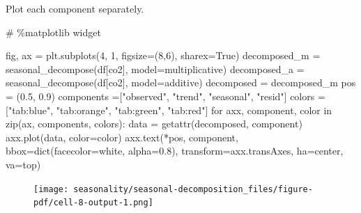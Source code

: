 \documentclass[
  letterpaper,
  DIV=11,
  numbers=noendperiod,
  oneside]{scrreprt}
\newenvironment{Shaded}{\begin{snugshade}}{\end{snugshade}}
\newcommand{\BuiltInTok}[1]{\textcolor[rgb]{0.00,0.23,0.31}{#1}}
\newcommand{\CommentTok}[1]{\textcolor[rgb]{0.37,0.37,0.37}{#1}}
\newcommand{\ControlFlowTok}[1]{\textcolor[rgb]{0.00,0.23,0.31}{#1}}
\newcommand{\DecValTok}[1]{\textcolor[rgb]{0.68,0.00,0.00}{#1}}
\newcommand{\FloatTok}[1]{\textcolor[rgb]{0.68,0.00,0.00}{#1}}
\newcommand{\KeywordTok}[1]{\textcolor[rgb]{0.00,0.23,0.31}{#1}}
\newcommand{\NormalTok}[1]{\textcolor[rgb]{0.00,0.23,0.31}{#1}}
\newcommand{\OperatorTok}[1]{\textcolor[rgb]{0.37,0.37,0.37}{#1}}
\newcommand{\StringTok}[1]{\textcolor[rgb]{0.13,0.47,0.30}{#1}}
\newcommand{\VariableTok}[1]{\textcolor[rgb]{0.07,0.07,0.07}{#1}}
\begin{document}
Plot each component separately.

\begin{Shaded}
\begin{Highlighting}[]
\CommentTok{\# \%matplotlib widget}

\NormalTok{fig, ax }\OperatorTok{=}\NormalTok{ plt.subplots(}\DecValTok{4}\NormalTok{, }\DecValTok{1}\NormalTok{, figsize}\OperatorTok{=}\NormalTok{(}\DecValTok{8}\NormalTok{,}\DecValTok{6}\NormalTok{), sharex}\OperatorTok{=}\VariableTok{True}\NormalTok{)}
\NormalTok{decomposed\_m }\OperatorTok{=}\NormalTok{ seasonal\_decompose(df[}\StringTok{\textquotesingle{}co2\textquotesingle{}}\NormalTok{], model}\OperatorTok{=}\StringTok{\textquotesingle{}multiplicative\textquotesingle{}}\NormalTok{)}
\NormalTok{decomposed\_a }\OperatorTok{=}\NormalTok{ seasonal\_decompose(df[}\StringTok{\textquotesingle{}co2\textquotesingle{}}\NormalTok{], model}\OperatorTok{=}\StringTok{\textquotesingle{}additive\textquotesingle{}}\NormalTok{)}
\NormalTok{decomposed }\OperatorTok{=}\NormalTok{ decomposed\_m}
\NormalTok{pos }\OperatorTok{=}\NormalTok{ (}\FloatTok{0.5}\NormalTok{, }\FloatTok{0.9}\NormalTok{)}
\NormalTok{components }\OperatorTok{=}\NormalTok{[}\StringTok{"observed"}\NormalTok{, }\StringTok{"trend"}\NormalTok{, }\StringTok{"seasonal"}\NormalTok{, }\StringTok{"resid"}\NormalTok{]}
\NormalTok{colors }\OperatorTok{=}\NormalTok{ [}\StringTok{"tab:blue"}\NormalTok{, }\StringTok{"tab:orange"}\NormalTok{, }\StringTok{"tab:green"}\NormalTok{, }\StringTok{"tab:red"}\NormalTok{]}
\ControlFlowTok{for}\NormalTok{ axx, component, color }\KeywordTok{in} \BuiltInTok{zip}\NormalTok{(ax, components, colors):}
\NormalTok{    data }\OperatorTok{=} \BuiltInTok{getattr}\NormalTok{(decomposed, component)}
\NormalTok{    axx.plot(data, color}\OperatorTok{=}\NormalTok{color)}
\NormalTok{    axx.text(}\OperatorTok{*}\NormalTok{pos, component, bbox}\OperatorTok{=}\BuiltInTok{dict}\NormalTok{(facecolor}\OperatorTok{=}\StringTok{\textquotesingle{}white\textquotesingle{}}\NormalTok{, alpha}\OperatorTok{=}\FloatTok{0.8}\NormalTok{),}
\NormalTok{           transform}\OperatorTok{=}\NormalTok{axx.transAxes, ha}\OperatorTok{=}\StringTok{\textquotesingle{}center\textquotesingle{}}\NormalTok{, va}\OperatorTok{=}\StringTok{\textquotesingle{}top\textquotesingle{}}\NormalTok{)}
\end{Highlighting}
\end{Shaded}

\begin{figure}[H]

{\centering \texttt{[image: seasonality/seasonal-decomposition\_files/figure-pdf/cell-8-output-1.png]}

}

\end{figure}
\end{document}
